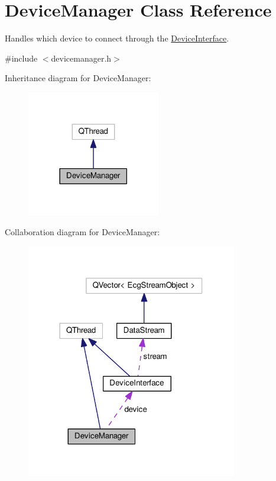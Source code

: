 \hypertarget{classDeviceManager}{}\section{Device\+Manager Class Reference}
\label{classDeviceManager}


Handles which device to connect through the \hyperlink{classDeviceInterface}{Device\+Interface}.  




{\ttfamily \#include $<$devicemanager.\+h$>$}



Inheritance diagram for Device\+Manager\+:\nopagebreak
\begin{figure}[H]
\begin{center}
\leavevmode
\includegraphics[width=165pt]{classDeviceManager__inherit__graph}
\end{center}
\end{figure}


Collaboration diagram for Device\+Manager\+:\nopagebreak
\begin{figure}[H]
\begin{center}
\leavevmode
\includegraphics[width=261pt]{classDeviceManager__coll__graph}
\end{center}
\end{figure}
